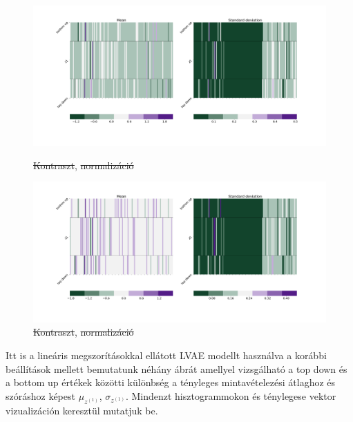 \documentclass[12pt, english]{article}
\begin{document}
\begin{figure}[H]
  \begin{minipage}{0.5\linewidth}
    \centering
    \includegraphics[width=.8\linewidth]{z1_vis/14_DenseLinLinLadderVAE_noContrastNorm_-stats-1_vector_comparisons_1.png} 
    \caption{\st{Kontraszt}, \st{normalizáció}}
    \label{fig:sample-no-norm-no-contrast-1}
  \end{minipage}
  \begin{minipage}{0.5\linewidth}
    \centering
    \includegraphics[width=.8\linewidth]{z1_vis/14_DenseLinLinLadderVAE_noContrastNorm_-stats-2_vector_comparisons_1.png}
    \caption{\st{Kontraszt}, \st{normalizáció}}
    \label{fig:sample-no-norm-no-contrast-2}
  \end{minipage}
\end{figure}

\vspace{4mm}

\par Itt is a lineáris megszorításokkal ellátott LVAE modellt használva a korábbi beállítások mellett bemutatunk néhány ábrát amellyel vizsgálható a top down és a bottom up értékek közötti különbség a tényleges mintavételezési átlaghoz és szóráshoz képest $\mu_{z^{(1)}}$, $\sigma_{z^{(1)}}$. Mindenzt hisztogrammokon és ténylegese vektor vizualizáción keresztül mutatjuk be.

\vspace{4mm}
\end{document}
